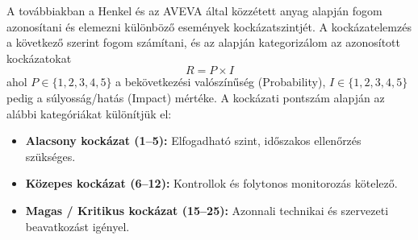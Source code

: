 A továbbiakban a Henkel és az AVEVA által közzétett anyag alapján fogom azonosítani és elemezni különböző események kockázatszintjét. A kockázatelemzés a következő szerint fogom számítani, és az alapján kategorizálom az azonosított kockázatokat
\begin{equation} R = P \times I \end{equation} ahol $P \in \{1, 2, 3, 4, 5\}$ a bekövetkezési valószínűség (Probability), $I \in \{1, 2, 3, 4, 5\}$ pedig a súlyosság/hatás (Impact) mértéke. A kockázati pontszám alapján az alábbi kategóriákat különítjük el: \begin{itemize} \item \textbf{Alacsony kockázat (1--5):} Elfogadható szint, időszakos ellenőrzés szükséges. \item \textbf{Közepes kockázat (6--12):} Kontrollok és folytonos monitorozás kötelező. \item \textbf{Magas / Kritikus kockázat (15--25):} Azonnali technikai és szervezeti beavatkozást igényel. \end{itemize}
